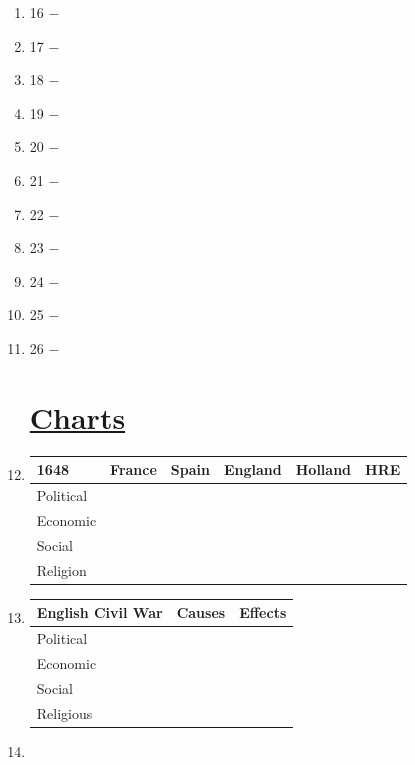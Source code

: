 \documentclass[12pt]{article}
\begin{document}
\begin{enumerate}
\item 16 $-$ 

\item 17 $-$ 

\item 18 $-$ 

\item 19 $-$ 

\item 20 $-$ 

\item 21 $-$ 

\item 22 $-$ 

\item 23 $-$ 

\item 24 $-$ 

\item 25 $-$ 

\item 26 $-$ 

\section{\underline{Charts}}

\item \begin{tabular}{|l|l|l|l|l|l|}

\hline
1648 & France & Spain & England & Holland & HRE \\
\hline
Political & & & & & \\
\hline
Economic & & & & & \\
\hline
Social & & & & & \\
\hline
Religion & & & & & \\
\hline


\end{tabular}

\item \begin{tabular}{|l|l|l|}

\hline
English Civil War & Causes & Effects \\
\hline
Political & & \\
\hline
Economic & & \\
\hline
Social & & \\
\hline
Religious & & \\
\hline

\end{tabular}

\item \begin{tabular}{|l|l|l|}


\end{tabular}
\end{enumerate}
\end{document}
